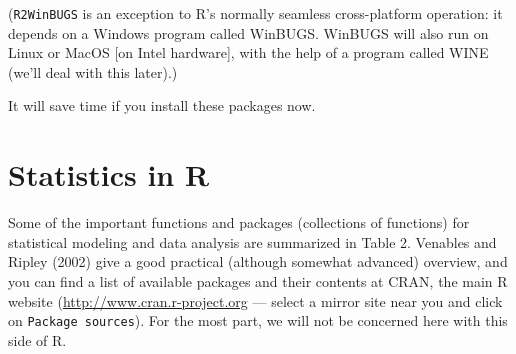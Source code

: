 \documentclass[11pt,]{article}
\begin{document}
(\texttt{R2WinBUGS} is an exception to R's normally seamless
cross-platform operation: it depends on a Windows program called
WinBUGS. WinBUGS will also run on Linux or MacOS {[}on Intel
hardware{]}, with the help of a program called WINE (we'll deal with
this later).)

It will save time if you install these packages now.

\section{Statistics in R}\label{statistics-in-r}

Some of the important functions and packages (collections of functions)
for statistical modeling and data analysis are summarized in Table 2.
Venables and Ripley (2002) give a good practical (although somewhat
advanced) overview, and you can find a list of available packages and
their contents at CRAN, the main R website
(\url{http://www.cran.r-project.org} --- select a mirror site near you
and click on \texttt{Package\ sources}). For the most part, we will not
be concerned here with this side of R.
\end{document}
